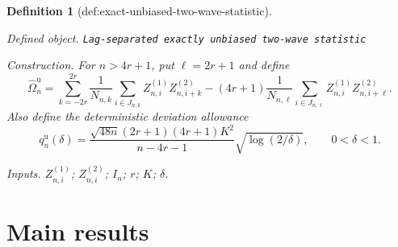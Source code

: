 \documentclass{article}
\newtheorem{definition}{Definition}
\begin{document}
\begin{definition}[def:exact-unbiased-two-wave-statistic]\label{def:exact-unbiased-two-wave-statistic}
\par\smallskip\noindent\emph{Defined object.} \texttt{Lag-\allowbreak{}separated exactly unbiased two-\allowbreak{}wave statistic}
\par\smallskip\noindent\emph{Construction.} For \(n>4r+1\), put \(\ell=2r+1\) and define
\[
 \widehat\Omega_n^{\mathrm u}
 =\sum_{k=-2r}^{2r}
 \frac1{N_{n,k}}\sum_{i\in J_{n,k}}
 Z_{n,i}^{(1)}Z_{n,i+k}^{(2)}
 -(4r+1)\frac1{N_{n,\ell}}\sum_{i\in J_{n,\ell}}
 Z_{n,i}^{(1)}Z_{n,i+\ell}^{(2)}.
\]
Also define the deterministic deviation allowance
\[
 q_n^{\mathrm u}(\delta)
 =\frac{\sqrt{48n}(2r+1)(4r+1)K^2}{n-4r-1}
 \sqrt{\log(2/\delta)},
 \qquad 0<\delta<1.
\]
\par\smallskip\noindent\emph{Inputs.} \(Z_{n,i}^{(1)}\); \(Z_{n,i}^{(2)}\); \(I_n\); \(r\); \(K\); \(\delta\).
\end{definition}

\section{Main results}
\end{document}
